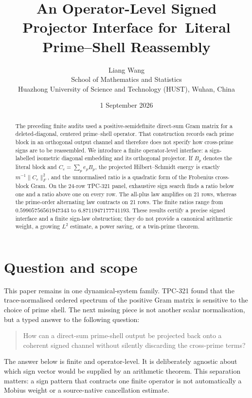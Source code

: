 \documentclass[10pt]{article}
\title{An Operator-Level Signed Projector Interface for\
Literal Prime--Shell Reassembly}
\author{Liang Wang\\
School of Mathematics and Statistics\\
Huazhong University of Science and Technology (HUST), Wuhan, China}
\date{1 September 2026}
\begin{document}
\maketitle

\begin{abstract}
The preceding finite audits used a positive-semidefinite direct-sum Gram
matrix for a deleted-diagonal, centered prime--shell operator.  That
construction records each prime block in an orthogonal output channel and
therefore does not specify how cross-prime signs are to be reassembled.  We
introduce a finite operator-level interface: a sign-labelled isometric
diagonal embedding and its orthogonal projector.  If $B_p$ denotes the
literal block and $C_e=\sum_p e_pB_p$, the projected Hilbert--Schmidt energy
is exactly $m^{-1}\|C_e\|_F^2$, and the unnormalised ratio is a quadratic form
of the Frobenius cross-block Gram.  On the 24-row TPC-321 panel, exhaustive
sign search finds a ratio below one and a ratio above one on every row.  The
all-plus law amplifies on 21 rows, whereas the prime-order alternating law
contracts on 21 rows.  The finite ratios range from
$0.59905756561947343$ to $6.8711947177741193$.  These results certify a
precise signed interface and a finite sign-law obstruction; they do not
provide a canonical arithmetic weight, a growing $L^2$ estimate, a power
saving, or a twin-prime theorem.
\end{abstract}

\section{Question and scope}

This paper remains in one dynamical-system family.  TPC-321 found that the
trace-normalised ordered spectrum of the positive Gram matrix is sensitive to
the choice of prime shell.  The next missing piece is not another scalar
normalisation, but a typed answer to the following question:

\begin{quote}
How can a direct-sum prime-shell output be projected back onto a coherent
signed channel without silently discarding the cross-prime terms?
\end{quote}

The answer below is finite and operator-level.  It is deliberately agnostic
about which sign vector would be supplied by an arithmetic theorem.  This
separation matters: a sign pattern that contracts one finite operator is not
automatically a Mobius weight or a source-native cancellation estimate.
\end{document}

